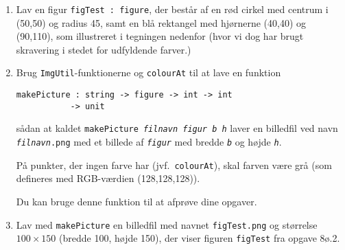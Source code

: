 \documentclass[a4paper,12pt]{article}
\begin{document}
\begin{enumerate}[label=8ø.\arabic*]

\item Lav en figur \texttt{figTest : figure}, der består af en rød cirkel
  med centrum i (50,50) og radius 45, samt en blå rektangel med
  hjørnerne (40,40) og (90,110), som illustreret i tegningen nedenfor (hvor vi dog har brugt skravering i stedet for udfyldende farver.)
  \begin{center}
    \begin{minipage}{.23\textwidth}
    \end{minipage}
  \end{center}

\item Brug \texttt{ImgUtil}-funktionerne og \texttt{colourAt} til at lave en
  funktion

  \vspace{-4mm}
\begin{verbatim}
makePicture : string -> figure -> int -> int
           -> unit
\end{verbatim}
  \vspace{-4mm}
  
  \noindent
  sådan at kaldet \texttt{makePicture \emph{filnavn figur b h}} laver en
  billedfil ved navn \texttt{\emph{filnavn}.png} med et billede af
  \texttt{\emph{figur}} med bredde \texttt{\emph{b}} og højde
  \texttt{\emph{h}}.
  
  På punkter, der ingen farve har (jvf.\ \texttt{colourAt}), skal farven
  være grå (som defineres med RGB-værdien (128,128,128)).
  
  Du kan bruge denne funktion til at afprøve dine opgaver.

\item Lav med \texttt{makePicture} en billedfil med navnet
  \texttt{figTest.png} og størrelse $100\times150$ (bredde 100, højde 150),
  der viser figuren \texttt{figTest} fra opgave 8ø.2.


\end{enumerate}
\end{document}
